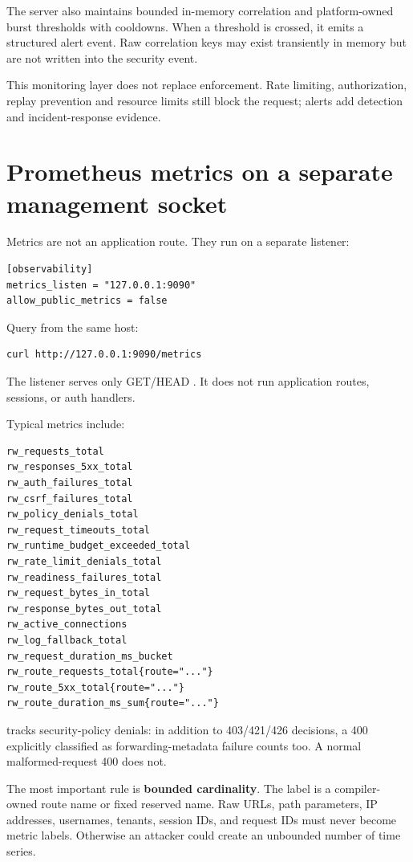 The server also maintains bounded in-memory correlation and platform-owned burst thresholds with cooldowns. When a threshold is crossed, it emits a structured  alert event. Raw correlation keys may exist transiently in memory but are not written into the security event.

This monitoring layer does not replace enforcement. Rate limiting, authorization, replay prevention and resource limits still block the request; alerts add detection and incident-response evidence.

\section{Prometheus metrics on a separate management socket}

Metrics are not an application route. They run on a separate listener:

\begin{lstlisting}
[observability]
metrics_listen = "127.0.0.1:9090"
allow_public_metrics = false
\end{lstlisting}

Query from the same host:

\begin{lstlisting}
curl http://127.0.0.1:9090/metrics
\end{lstlisting}

The listener serves only GET/HEAD . It does not run application routes, sessions, or auth handlers.

Typical metrics include:

\begin{lstlisting}
rw_requests_total
rw_responses_5xx_total
rw_auth_failures_total
rw_csrf_failures_total
rw_policy_denials_total
rw_request_timeouts_total
rw_runtime_budget_exceeded_total
rw_rate_limit_denials_total
rw_readiness_failures_total
rw_request_bytes_in_total
rw_response_bytes_out_total
rw_active_connections
rw_log_fallback_total
rw_request_duration_ms_bucket
rw_route_requests_total{route="..."}
rw_route_5xx_total{route="..."}
rw_route_duration_ms_sum{route="..."}
\end{lstlisting}

 tracks security-policy denials: in addition to 403/421/426 decisions, a 400 explicitly classified as forwarding-metadata failure counts too. A normal malformed-request 400 does not.

The most important rule is \textbf{bounded cardinality}. The  label is a compiler-owned route name or fixed reserved name. Raw URLs, path parameters, IP addresses, usernames, tenants, session IDs, and request IDs must never become metric labels. Otherwise an attacker could create an unbounded number of time series.

